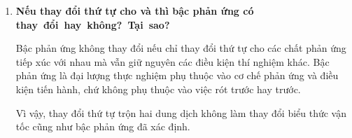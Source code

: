 \begin{enumerate}
        Về bản chất, vận tốc được xác định từ thương số giữa độ biến thiên nồng độ và khoảng thời gian đo được nên đó là vận tốc trung bình trong khoảng thời gian \(\Delta t\).

        Tuy nhiên, trong phương pháp này người ta đo thời gian để hệ đạt đến cùng một mức độ vẩn đục, tức là lượng lưu huỳnh tạo thành đến thời điểm quan sát là gần như như nhau giữa các lần thí nghiệm. Vì \(\Delta C\) rất nhỏ nên giá trị vận tốc trung bình đó thường được dùng để xấp xỉ vận tốc ban đầu, hay gần đúng với vận tốc tức thời của phản ứng.

    \item \textbf{Nếu thay đổi thứ tự cho  và  thì bậc phản ứng có \mbox{thay đổi hay không? Tại sao?}}

        Bậc phản ứng không thay đổi nếu chỉ thay đổi thứ tự cho các chất phản ứng tiếp xúc với nhau mà vẫn giữ nguyên các điều kiện thí nghiệm khác. Bậc phản ứng là đại lượng thực nghiệm phụ thuộc vào cơ chế phản ứng và điều kiện tiến hành, chứ không phụ thuộc vào việc rót  trước hay  trước.

        Vì vậy, thay đổi thứ tự trộn hai dung dịch không làm thay đổi biểu thức vận tốc cũng như bậc phản ứng đã xác định.
\end{enumerate}